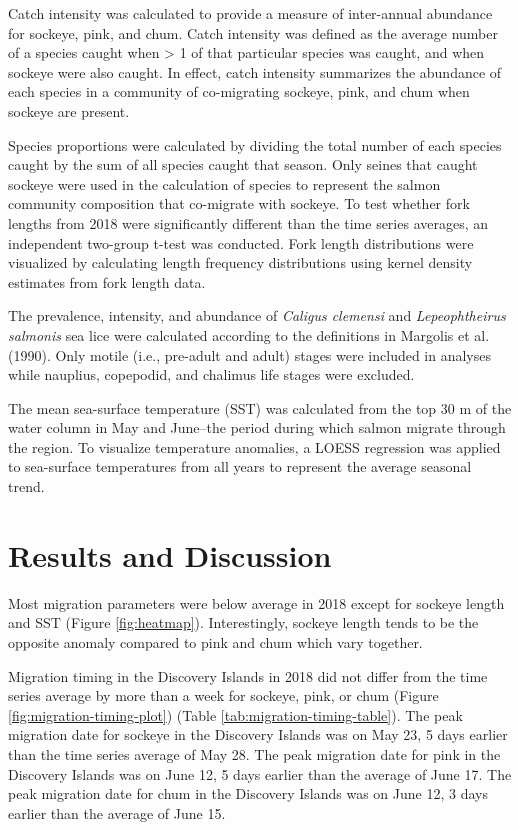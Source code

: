\documentclass[fleqn,10pt]{wlpeerj} %
\begin{document}
Catch intensity was calculated to provide a measure of inter-annual
abundance for sockeye, pink, and chum. Catch intensity was defined as
the average number of a species caught when \textgreater{} 1 of that
particular species was caught, and when sockeye were also caught. In
effect, catch intensity summarizes the abundance of each species in a
community of co-migrating sockeye, pink, and chum when sockeye are
present.

Species proportions were calculated by dividing the total number of each
species caught by the sum of all species caught that season. Only seines
that caught sockeye were used in the calculation of species to represent
the salmon community composition that co-migrate with sockeye. To test
whether fork lengths from 2018 were significantly different than the
time series averages, an independent two-group t-test was conducted.
Fork length distributions were visualized by calculating length
frequency distributions using kernel density estimates from fork length
data.

The prevalence, intensity, and abundance of \emph{Caligus clemensi} and
\emph{Lepeophtheirus salmonis} sea lice were calculated according to the
definitions in Margolis et al. (1990). Only motile (i.e., pre-adult and
adult) stages were included in analyses while nauplius, copepodid, and
chalimus life stages were excluded.

The mean sea-surface temperature (SST) was calculated from the top 30 m
of the water column in May and June--the period during which salmon
migrate through the region. To visualize temperature anomalies, a LOESS
regression was applied to sea-surface temperatures from all years to
represent the average seasonal trend.

\section{Results and Discussion}\label{results-and-discussion}

Most migration parameters were below average in 2018 except for sockeye
length and SST (Figure \ref{fig:heatmap}). Interestingly, sockeye length
tends to be the opposite anomaly compared to pink and chum which vary
together.

Migration timing in the Discovery Islands in 2018 did not differ from
the time series average by more than a week for sockeye, pink, or chum
(Figure \ref{fig:migration-timing-plot}) (Table
\ref{tab:migration-timing-table}). The peak migration date for sockeye
in the Discovery Islands was on May 23, 5 days earlier than the time
series average of May 28. The peak migration date for pink in the
Discovery Islands was on June 12, 5 days earlier than the average of
June 17. The peak migration date for chum in the Discovery Islands was
on June 12, 3 days earlier than the average of June 15.
\end{document}
